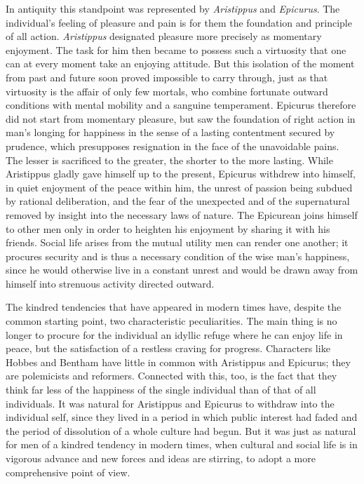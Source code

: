 \documentclass[12pt,a4paper,openany]{book}
\newcommand{\opage}[1]{\marginnote{\footnotesize\textit{[#1]}}}
\begin{document}
In antiquity this standpoint was represented by \emph{Aristippus} and
\emph{Epicurus}. The individual's feeling of pleasure and pain is for them the
foundation and principle of all action. \emph{Aristippus} designated pleasure
more precisely as momentary enjoyment. The task for him then became to possess
such a virtuosity that one can at every moment take an enjoying attitude. But
this isolation of the moment from past and future soon proved impossible to
carry through, just as that virtuosity is the affair of only few mortals, who
combine fortunate outward conditions with mental mobility and a sanguine
temperament. Epicurus therefore did not start from momentary pleasure, but saw
the foundation of right action in man's longing for happiness in the sense of
a lasting contentment secured by prudence, which presupposes resignation in
the face of the unavoidable pains. The lesser is sacrificed to the greater,
the shorter to the more lasting. While Aristippus gladly gave himself up to
the present, Epicurus withdrew into himself, in quiet enjoyment of the peace
within him, the unrest of passion being subdued by rational deliberation, and
the fear of the unexpected and of the supernatural removed by insight into the
necessary laws of nature. The Epicurean joins himself to other men only in
order to heighten his enjoyment by sharing it with his friends. Social life
arises from the mutual utility men can render one another; it procures
security and is thus a necessary condition of the wise man's
\opage{21}happiness, since he would otherwise live in a constant unrest and
would be drawn away from himself into strenuous activity directed outward.

The kindred tendencies that have appeared in modern times have, despite the
common starting point, two characteristic peculiarities. The main thing is no
longer to procure for the individual an idyllic refuge where he can enjoy life
in peace, but the satisfaction of a restless craving for progress. Characters
like Hobbes and Bentham have little in common with Aristippus and Epicurus;
they are polemicists and reformers. Connected with this, too, is the fact that
they think far less of the happiness of the single individual than of that of
all individuals. It was natural for Aristippus and Epicurus to withdraw into
the individual self, since they lived in a period in which public interest had
faded and the period of dissolution of a whole culture had begun. But it was
just as natural for men of a kindred tendency in modern times, when cultural
and social life is in vigorous advance and new forces and ideas are stirring,
to adopt a more comprehensive point of view.
\end{document}
